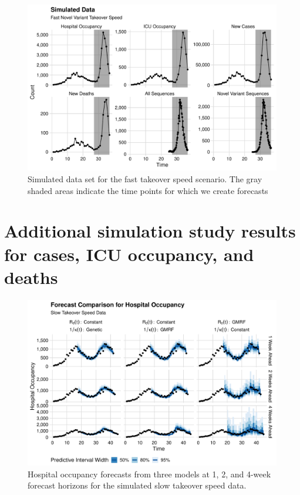 \begin{figure}
    \centering
    \includegraphics[width=1.0\columnwidth]{simulated_binned_data_fast_plot}
    \caption[Simulated data set for the fast takeover speed scenario.]{Simulated data set for the fast takeover speed scenario.
    The gray shaded areas indicate the time points for which we create forecasts}
    \label{ch_5:fig:simulated_binned_data_fast_plot}
\end{figure}

\section{Additional simulation study results for cases, ICU occupancy, and deaths}
\label{ch_5:sec:sim_cases_icu_death}

\begin{figure}
    \centering
    \includegraphics[width=1.0\columnwidth]{simulated_forecast_comparison_data_hospitalizations_slow_plot}
\caption[Hospital occupancy forecasts for simulated slow takeover speed data.]{Hospital occupancy forecasts from three models at 1, 2, and 4-week forecast horizons for the simulated slow takeover speed data.}
    \label{ch_5:fig:simulated_forecast_comparison_data_hospitalizations_slow_plot}
\end{figure}

